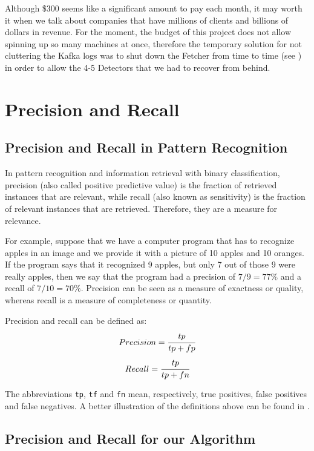 Although \$300 seems like a significant amount to pay each month, it may
worth it when we talk about companies that have millions of clients and
billions of dollars in revenue. For the moment, the budget of this project does not allow
spinning up so many machines at once, therefore the temporary solution for not
cluttering the Kafka logs was to shut down the Fetcher from time to time (see
) in
order to allow the 4-5 Detectors that we had to recover from behind.

\section{Precision and Recall}
\label{sec:prec-recall}

\subsection{Precision and Recall in Pattern Recognition}

In pattern recognition and information retrieval with binary classification,
precision (also called positive predictive value) is the fraction of retrieved
instances that are relevant, while recall (also known as sensitivity) is the
fraction of relevant instances that are retrieved. Therefore, they are a
measure for relevance.

For example, suppose that we have a computer program that has to recognize
apples in an image and we provide it with a picture of 10 apples and 10
oranges. If the program says that it recognized 9 apples, but only 7 out of
those 9 were really apples, then we say that the program had a precision of
\(7 / 9 = 77\%\) and a recall of \(7 / 10 = 70\%\). Precision can be seen as a
measure of exactness or quality, whereas recall is a measure of completeness
or quantity.


Precision and recall can be defined as:
\[ Precision = \cfrac{tp}{tp + fp} \]
\[ Recall = \cfrac{tp}{tp + fn} \]

The abbreviations \texttt{tp}, \texttt{tf} and \texttt{fn} mean, respectively,
true positives, false positives and false negatives. A better illustration of
the definitions above can be found in .

\subsection{Precision and Recall for our Algorithm}

